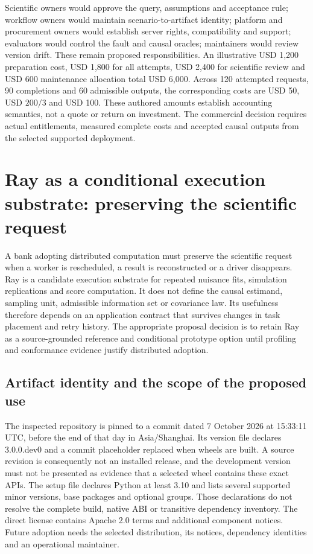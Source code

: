 Scientific owners would approve the query, assumptions and acceptance rule;
workflow owners would maintain scenario-to-artifact identity; platform and
procurement owners would establish server rights, compatibility and support;
evaluators would control the fault and causal oracles; maintainers would
review version drift. These remain proposed responsibilities. An illustrative
USD 1,200 preparation cost, USD 1,800 for all attempts, USD 2,400 for scientific
review and USD 600 maintenance allocation total USD 6,000. Across 120 attempted
requests, 90 completions and 60 admissible outputs, the corresponding costs
are USD 50, USD $200/3$ and USD 100. These authored amounts establish accounting
semantics, not a quote or return on investment. The commercial decision requires
actual entitlements, measured complete costs and accepted causal outputs from
the selected supported deployment.~\citep{exec25_dataiku_choice}


\section{Ray as a conditional execution substrate: preserving the scientific request}
\label{sec:exec24-ray}
A bank adopting distributed computation must preserve the scientific request when a worker is rescheduled, a result is reconstructed or a driver disappears. Ray is a candidate execution substrate for repeated nuisance fits, simulation replications and score computation. It does not define the causal estimand, sampling unit, admissible information set or covariance law. Its usefulness therefore depends on an application contract that survives changes in task placement and retry history. The appropriate proposal decision is to retain Ray as a source-grounded reference and conditional prototype option until profiling and conformance evidence justify distributed adoption.~\citep{exec24_ray_sources,exec24_ray_contract}

\subsection{Artifact identity and the scope of the proposed use}
The inspected repository is pinned to a commit dated 7 October 2026 at 15:33:11 UTC, before the end of that day in Asia/Shanghai. Its version file declares 3.0.0.dev0 and a commit placeholder replaced when wheels are built. A source revision is consequently not an installed release, and the development version must not be presented as evidence that a selected wheel contains these exact APIs. The setup file declares Python at least 3.10 and lists several supported minor versions, base packages and optional groups. Those declarations do not resolve the complete build, native ABI or transitive dependency inventory. The direct license contains Apache 2.0 terms and additional component notices. Future adoption needs the selected distribution, its notices, dependency identities and an operational maintainer.~\citep{exec24_ray_sources}


